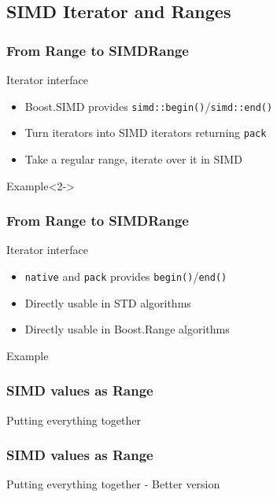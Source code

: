 \subsection{SIMD Iterator and Ranges}
\frame
{
  \frametitle{From Range to SIMDRange}
  \begin{block}{Iterator interface}
  \begin{itemize}
  \item Boost.SIMD provides \texttt{simd::begin()}/\texttt{simd::end()}
  \item Turn iterators into SIMD iterators returning \texttt{pack}
  \item Take a regular range, iterate over it in SIMD
  \end{itemize}
  \end{block}

  \begin{block}{Example}<2->
  \begin{center}
  \end{center}
  \end{block}
}

\frame
{
  \frametitle{From Range to SIMDRange}
  \begin{block}{Iterator interface}
  \begin{itemize}
  \item \texttt{native} and \texttt{pack} provides \texttt{begin()}/\texttt{end()}
  \item Directly usable in STD algorithms
  \item Directly usable in Boost.Range algorithms
  \end{itemize}
  \end{block}{}

  \begin{block}{Example}
  \begin{center}
  \lstpackrange
  \end{center}
  \end{block}{}
}

\frame
{
  \frametitle{SIMD values as Range}
  \begin{block}{Putting everything together}
  \begin{center}
  \lstranges
  \end{center}
  \end{block}{}
}

\frame
{
  \frametitle{SIMD values as Range}
  \begin{block}{Putting everything together - Better version}
  \begin{center}
  \lstrangesb
  \end{center}
  \end{block}{}
}
